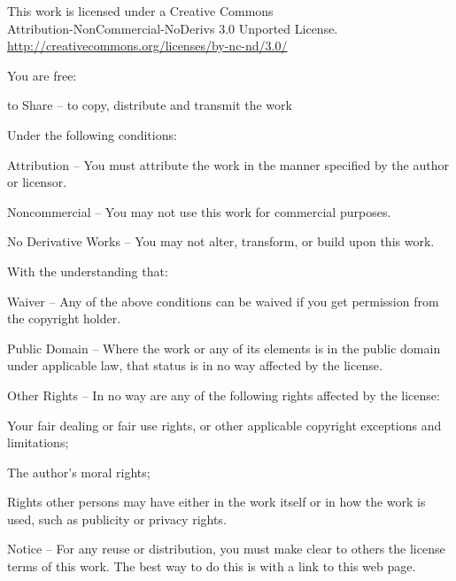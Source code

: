 
\vspace*{-2.5\baselineskip}
\enlargethispage{\baselineskip}

{\copyrightsize\setlength{\parindent}{0pt}%
\raggedright\label{copyright-details}
\setlength{\parskip}{3pt}
{\centering

{\large\ccbyncnd}

This work is licensed under a Creative Commons\\
Attribution-NonCommercial-NoDerivs 3.0 Unported License.\\
\href{http://creativecommons.org/licenses/by-nc-nd/3.0/}{http://creativecommons.org/licenses/by-nc-nd/3.0/}

}

You are free:
\begin{packeditemize}
  \item to Share -- to copy, distribute and transmit the work
\end{packeditemize}


Under the following conditions:

\begin{packeditemize}
\item Attribution -- You must attribute the work in the manner specified by the author or licensor.
\item Noncommercial -- You may not use this work for commercial purposes.
\item No Derivative Works -- You may not alter, transform, or build upon this work.
\end{packeditemize}

With the understanding that:

\begin{packeditemize}
    \item Waiver -- Any of the above conditions can be waived if you get permission from the copyright holder.
    \item Public Domain -- Where the work or any of its elements is in the public domain under applicable law, that status is in no way affected by the license.
    \item Other Rights -- In no way are any of the following rights affected by the license:
        \begin{packeditemize}
            \item Your fair dealing or fair use rights, or other applicable copyright exceptions and limitations;
            \item The author's moral rights;
            \item Rights other persons may have either in the work itself or in how the work is used, such as publicity or privacy rights.
        \end{packeditemize}
    \item Notice -- For any reuse or distribution, you must make clear to others the license terms of this work. The best way to do this is with a link to this web page.
\end{packeditemize}

}
